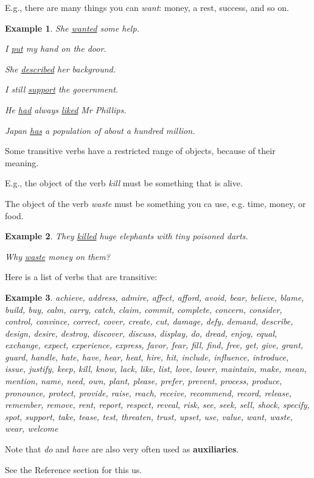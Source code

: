\documentclass[oneside]{book}
\numberwithin{equation}{section}
\newtheorem{example}{Example}[section]
\begin{document}
E.g., there are many things you can \textit{want}: money, a rest, success, and so on.
\begin{example}
    She \underline{wanted} some help.
    
    I \underline{put} my hand on the door.
    
    She \underline{described} her background.
    
    I still \underline{support} the government.
    
    He \underline{had} always \underline{liked} Mr Phillips.
    
    Japan \underline{has} a population of about a hundred million.
\end{example}
Some transitive verbs have a restricted range of objects, because of their meaning.

E.g., the object of the verb \textit{kill} must be something that is alive.

The object of the verb \textit{waste} must be something you ca use, e.g. time, money, or food.
\begin{example}
    They \underline{killed} huge elephants with tiny poisoned darts.
    
    Why \underline{waste} money on them?
\end{example}
%
\noindent{} Here is a list of verbs that are transitive:
\begin{example}
    achieve, address, admire, affect, afford, avoid, bear, believe, blame, build, buy, calm, carry, catch, claim, commit, complete, concern, consider, control, convince, correct, cover, create, cut, damage, defy, demand, describe, design, desire, destroy, discover, discuss, display, do, dread, enjoy, equal, exchange, expect, experience, express, favor, fear, fill, find, free, get, give, grant, guard, handle, hate, have, hear, heat, hire, hit, include, influence, introduce, issue, justify, keep, kill, know, lack, like, list, love, lower, maintain, make, mean, mention, name, need, own, plant, please, prefer, prevent, process, produce, pronounce, protect, provide, raise, reach, receive, recommend, record, release, remember, remove, rent, report, respect, reveal, risk, see, seek, sell, shock, specify, spot, support, take, tease, test, threaten, trust, upset, use, value, want, waste, wear, welcome
\end{example}
Note that \textit{do} and \textit{have} are also very often used as \textbf{auxiliaries}.

See the Reference section for this us.
\end{document}
